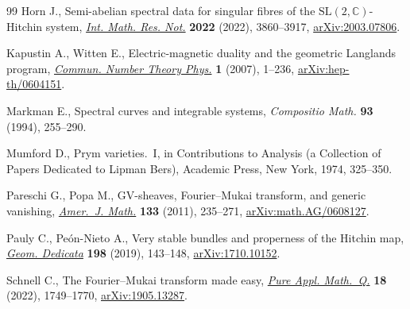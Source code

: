 \begin{thebibliography}{99}
Horn J., Semi-abelian spectral data for singular fibres of the
 {$\mathrm{SL}(2,\mathbb C)$}-{H}itchin system,
 \href{https://doi.org/10.1093/imrn/rnaa273}{\textit{Int. Math. Res. Not.}}
 \textbf{2022} (2022), 3860--3917,
 \href{http://arxiv.org/abs/2003.07806}{arXiv:2003.07806}.

Kapustin A., Witten E., Electric-magnetic duality and the geometric {L}anglands
 program, \href{https://doi.org/10.4310/CNTP.2007.v1.n1.a1}{\textit{Commun.
 Number Theory Phys.}} \textbf{1} (2007), 1--236,
 \href{http://arxiv.org/abs/hep-th/0604151}{arXiv:hep-th/0604151}.

Markman E., Spectral curves and integrable systems, \textit{Compositio Math.}
 \textbf{93} (1994), 255--290.

Mumford D., Prym varieties.~{I}, in Contributions to Analysis (a Collection of
 Papers Dedicated to {L}ipman {B}ers), Academic Press, New York, 1974,
 325--350.

Pareschi G., Popa M., G{V}-sheaves, {F}ourier--{M}ukai transform, and generic
 vanishing, \href{https://doi.org/10.1353/ajm.2011.0000}{\textit{Amer.~J.
 Math.}} \textbf{133} (2011), 235--271,
 \href{http://arxiv.org/abs/math.AG/0608127}{arXiv:math.AG/0608127}.

Pauly C., Pe\'{o}n-Nieto A., Very stable bundles and properness of the
 {H}itchin map, \href{https://doi.org/10.1007/s10711-018-0333-6}{\textit{Geom.
 Dedicata}} \textbf{198} (2019), 143--148,
 \href{http://arxiv.org/abs/1710.10152}{arXiv:1710.10152}.

Schnell C., The {F}ourier--{M}ukai transform made easy,
 \href{https://doi.org/10.4310/pamq.2022.v18.n4.a14}{\textit{Pure Appl.
 Math.~Q.}} \textbf{18} (2022), 1749--1770,
 \href{http://arxiv.org/abs/1905.13287}{arXiv:1905.13287}.

\end{thebibliography}
